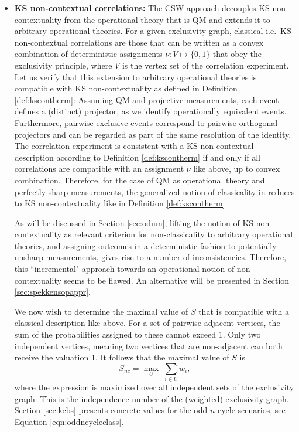 \begin{itemize}
    \item \textbf{KS non-contextual correlations:}
    The CSW approach decouples KS non-contextuality from the operational theory that is QM and extends it to arbitrary operational theories. For a given exclusivity graph, classical i.e.\ KS non-contextual correlations are those that can be written as a convex combination of deterministic assignments $\nu: V\mapsto\{0,1\}$ that obey the exclusivity principle, where $V$ is the vertex set of the correlation experiment. Let us verify that this extension to arbitrary operational theories is compatible with KS non-contextuality as defined in Definition \ref{def:kscontherm}: Assuming QM and projective measurements, each event defines a (distinct) projector, as we identify operationally equivalent events. Furthermore, pairwise exclusive events correspond to pairwise orthogonal projectors and can be regarded as part of the same resolution of the identity. The correlation experiment is consistent with a KS non-contextual description according to Definition \ref{def:kscontherm} if and only if all correlations are compatible with an assignment $\nu$ like above, up to convex combination. Therefore, for the case of QM as operational theory and perfectly sharp measurements, the generalized notion of classicality in \cite{Cabello2014} reduces to KS non-contextuality like in Definition \ref{def:kscontherm}.
    
    As will be discussed in Section \ref{sec:odum}, lifting the notion of KS non-contextuality as relevant criterion for non-classicality to arbitrary operational theories, and assigning outcomes in a deterministic fashion to potentially unsharp measurements, gives rise to a number of inconsistencies. Therefore, this ``incremental" \cite{Pusey2019} approach towards an operational notion of non-contextuality seems to be flawed. An alternative will be presented in Section \ref{sec:spekkensopappr}.
    
    We now wish to determine the maximal value of $S$ that is compatible with a classical description like above. For a set of pairwise adjacent vertices, the sum of the probabilities assigned to these cannot exceed 1. Only two independent vertices, meaning two vertices that are non-adjacent can both receive the valuation 1. It follows that the maximal value of $S$ is \begin{equation}
    S_{nc}=\max\limits_{U}\;\sum_{i\in U} w_i,
    \end{equation}
    where the expression is maximized over all independent sets of the exclusivity graph. This is the independence number of the (weighted) exclusivity graph. Section \ref{sec:kcbs} presents concrete values for the odd $n$-cycle scenarios, see Equation \ref{eqn:oddncycleclass}.
    

\end{itemize}
